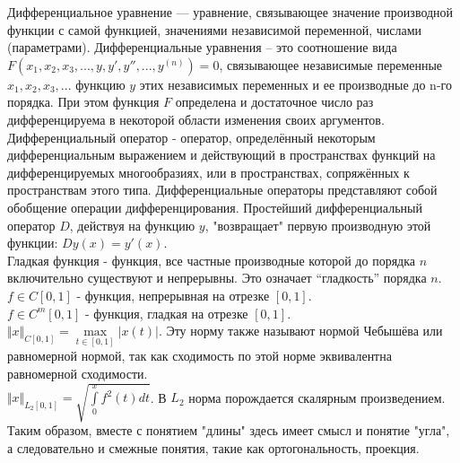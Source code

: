  


\renewcommand{\rmdefault}{cmr} %
\renewcommand{\sfdefault}{cmss} %
\renewcommand{\ttdefault}{cmtt} %





\tableofcontents

\abbrevdef
Дифференциальное уравнение — уравнение, связывающее значение производной функции с самой функцией, значениями независимой переменной, числами (параметрами). Дифференциальные уравнения – это соотношение вида $ F(x_1, x_2, x_3,...,y, y', y'',...,y^{(n)}) = 0 $, связывающее независимые переменные $ x_1, x_2, x_3,... $ функцию $ y $ этих независимых переменных и ее производные до n-го порядка. При этом функция $ F $ определена и достаточное число раз дифференцируема в некоторой области изменения своих аргументов. \\

Дифференциальный оператор - оператор, определённый некоторым дифференциальным выражением и действующий в пространствах функций на дифференцируемых многообразиях, или в пространствах, сопряжённых к пространствам этого типа. Дифференциальные операторы представляют собой обобщение операции дифференцирования. Простейший дифференциальный оператор $ D $, действуя на функцию $ y $, "возвращает" первую производную этой функции: $ Dy(x) = y'(x) $. \\

Гладкая функция - функция, все частные производные которой до порядка $ n $ включительно существуют и непрерывны. Это означает “гладкость” порядка $ n $. \\

$ f \in C[0,1] $ - функция, непрерывная на отрезке $[0,1]$. \\

$ f \in C^m[0,1] $ - функция, гладкая на отрезке $[0,1]$. \\

$ \Vert x \Vert_{C[0,1]} = \max\limits_{t \in [0,1]}\vert x(t) \vert $. Эту норму также называют нормой Чебышёва или равномерной нормой, так как сходимость по этой норме эквивалентна равномерной сходимости. \\

$ \Vert x \Vert_{L_2[0,1]} = \sqrt{\int\limits_0^x f^2(t)dt} $. В $ L_2 $ норма порождается скалярным произведением. Таким образом, вместе с понятием "длины" здесь имеет смысл и понятие "угла", а следовательно и смежные понятия, такие как ортогональность, проекция. \\

